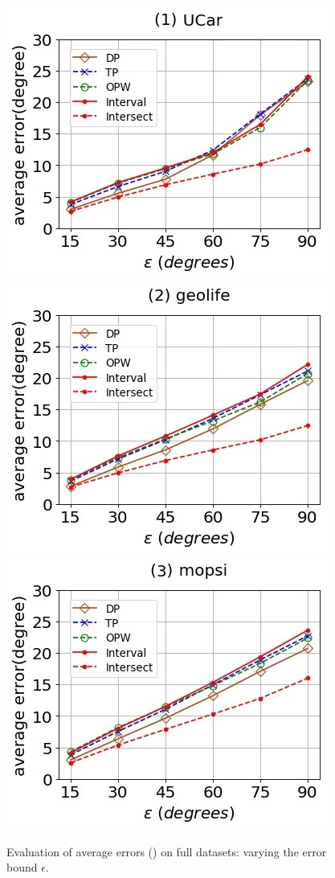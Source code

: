 \begin{figure}[tb!]
	\centering
	\includegraphics[scale=0.500]{Figures/Exp-DAD-error-epsilon-service.jpg}	\hspace{2ex}
	\includegraphics[scale=0.500]{Figures/Exp-DAD-error-epsilon-geolife.jpg}	\hspace{2ex}
	\includegraphics[scale=0.500]{Figures/Exp-DAD-error-epsilon-mopsi.jpg}	
	\vspace{-2ex}
	\caption{\small Evaluation of average errors (\dad) on full datasets: varying the error bound $\epsilon$.}
	\label{fig:ae-dad-epsilon}
	\vspace{-2ex}
\end{figure}
